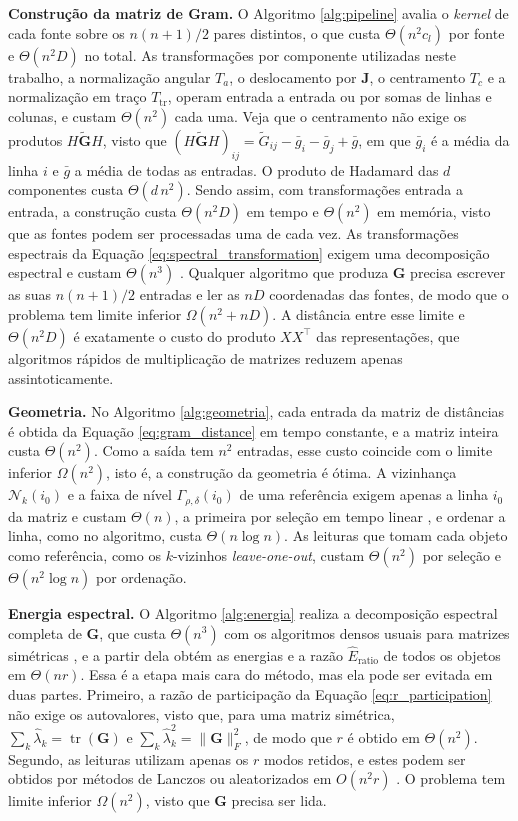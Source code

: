 \textbf{Construção da matriz de Gram.} O Algoritmo \ref{alg:pipeline} avalia o \textit{kernel} de cada fonte sobre os $n(n+1)/2$ pares distintos, o que custa $\Theta(n^2 c_l)$ por fonte e $\Theta(n^2 D)$ no total. As transformações por componente utilizadas neste trabalho, a normalização angular $T_a$, o deslocamento por $\mathbf{J}$, o centramento $T_c$ e a normalização em traço $T_{\mathrm{tr}}$, operam entrada a entrada ou por somas de linhas e colunas, e custam $\Theta(n^2)$ cada uma. Veja que o centramento não exige os produtos $H\widetilde{\mathbf{G}}H$, visto que $(H\widetilde{\mathbf{G}}H)_{ij} = \widetilde{G}_{ij} - \bar{g}_i - \bar{g}_j + \bar{g}$, em que $\bar{g}_i$ é a média da linha $i$ e $\bar{g}$ a média de todas as entradas. O produto de Hadamard das $d$ componentes custa $\Theta(d\,n^2)$. Sendo assim, com transformações entrada a entrada, a construção custa $\Theta(n^2 D)$ em tempo e $\Theta(n^2)$ em memória, visto que as fontes podem ser processadas uma de cada vez. As transformações espectrais da Equação \eqref{eq:spectral_transformation} exigem uma decomposição espectral e custam $\Theta(n^3)$ \citep{GolubVanLoan2013}. Qualquer algoritmo que produza $\mathbf{G}$ precisa escrever as suas $n(n+1)/2$ entradas e ler as $nD$ coordenadas das fontes, de modo que o problema tem limite inferior $\Omega(n^2 + nD)$. A distância entre esse limite e $\Theta(n^2 D)$ é exatamente o custo do produto $XX^\top$ das representações, que algoritmos rápidos de multiplicação de matrizes reduzem apenas assintoticamente.

\textbf{Geometria.} No Algoritmo \ref{alg:geometria}, cada entrada da matriz de distâncias é obtida da Equação \eqref{eq:gram_distance} em tempo constante, e a matriz inteira custa $\Theta(n^2)$. Como a saída tem $n^2$ entradas, esse custo coincide com o limite inferior $\Omega(n^2)$, isto é, a construção da geometria é ótima. A vizinhança $\mathcal{N}_k(i_0)$ e a faixa de nível $\Gamma_{\rho,\delta}(i_0)$ de uma referência exigem apenas a linha $i_0$ da matriz e custam $\Theta(n)$, a primeira por seleção em tempo linear \citep{Cormen2009}, e ordenar a linha, como no algoritmo, custa $\Theta(n \log n)$. As leituras que tomam cada objeto como referência, como os $k$-vizinhos \textit{leave-one-out}, custam $\Theta(n^2)$ por seleção e $\Theta(n^2 \log n)$ por ordenação.

\textbf{Energia espectral.} O Algoritmo \ref{alg:energia} realiza a decomposição espectral completa de $\mathbf{G}$, que custa $\Theta(n^3)$ com os algoritmos densos usuais para matrizes simétricas \citep{GolubVanLoan2013}, e a partir dela obtém as energias e a razão $\widehat{E}_{\mathrm{ratio}}$ de todos os objetos em $\Theta(nr)$. Essa é a etapa mais cara do método, mas ela pode ser evitada em duas partes. Primeiro, a razão de participação da Equação \eqref{eq:r_participation} não exige os autovalores, visto que, para uma matriz simétrica, $\sum_k \hat\lambda_k = \operatorname{tr}(\mathbf{G})$ e $\sum_k \hat\lambda_k^2 = \|\mathbf{G}\|_F^2$, de modo que $r$ é obtido em $\Theta(n^2)$. Segundo, as leituras utilizam apenas os $r$ modos retidos, e estes podem ser obtidos por métodos de Lanczos ou aleatorizados em $O(n^2 r)$ \citep{Halko2011}. O problema tem limite inferior $\Omega(n^2)$, visto que $\mathbf{G}$ precisa ser lida.

